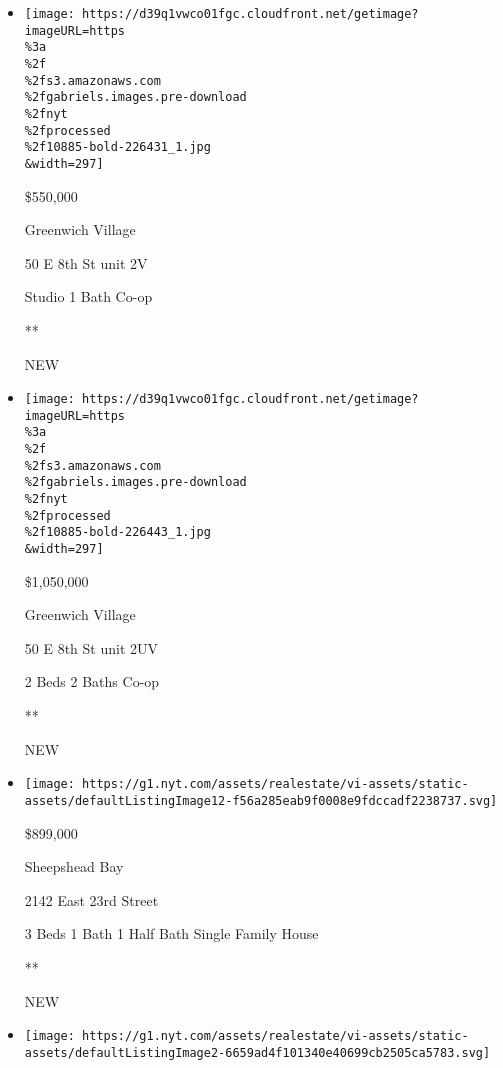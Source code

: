 \begin{itemize}
\item
  \href{/real-estate/usa/ny/new-york/greenwich-village/homes-for-sale/50-e-8th-st/10885-BOLD-226431?}{}

  \texttt{[image: https://d39q1vwco01fgc.cloudfront.net/getimage?imageURL=https\\\%3a\\\%2f\\\%2fs3.amazonaws.com\\\%2fgabriels.images.pre-download\\\%2fnyt\\\%2fprocessed\\\%2f10885-bold-226431\_1.jpg\\\&width=297]}

  \$550,000

  Greenwich Village

  50 E 8th St unit 2V

  Studio \textbar{} 1 Bath \textbar{} Co-op

  **

  NEW
\item
  \href{/real-estate/usa/ny/new-york/greenwich-village/homes-for-sale/50-e-8th-st/10885-BOLD-226443?}{}

  \texttt{[image: https://d39q1vwco01fgc.cloudfront.net/getimage?imageURL=https\\\%3a\\\%2f\\\%2fs3.amazonaws.com\\\%2fgabriels.images.pre-download\\\%2fnyt\\\%2fprocessed\\\%2f10885-bold-226443\_1.jpg\\\&width=297]}

  \$1,050,000

  Greenwich Village

  50 E 8th St unit 2UV

  2 Beds \textbar{} 2 Baths \textbar{} Co-op

  **

  NEW
\item
  \href{/real-estate/usa/ny/brooklyn/sheepshead-bay/homes-for-sale/2142-east-23rd-street/15101-5537036?}{}

  \texttt{[image: https://g1.nyt.com/assets/realestate/vi-assets/static-assets/defaultListingImage12-f56a285eab9f0008e9fdccadf2238737.svg]}

  \$899,000

  Sheepshead Bay

  2142 East 23rd Street

  3 Beds \textbar{} 1 Bath \textbar{} 1 Half Bath \textbar{} Single
  Family House

  **

  NEW
\item
  \href{/real-estate/usa/ny/queens/maspeth/homes-for-sale/64-21-60th-road/12436-OLRS-0061147?}{}

  \texttt{[image: https://g1.nyt.com/assets/realestate/vi-assets/static-assets/defaultListingImage2-6659ad4f101340e40699cb2505ca5783.svg]}


\end{itemize}
